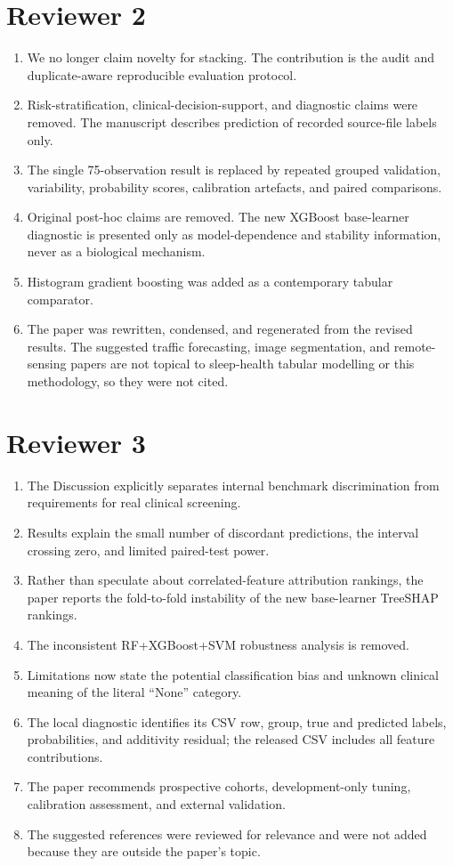 \documentclass[11pt]{article}
\begin{document}
\section*{Reviewer 2}
\begin{enumerate}
\item We no longer claim novelty for stacking. The contribution is the audit and duplicate-aware reproducible evaluation protocol.
\item Risk-stratification, clinical-decision-support, and diagnostic claims were removed. The manuscript describes prediction of recorded source-file labels only.
\item The single 75-observation result is replaced by repeated grouped validation, variability, probability scores, calibration artefacts, and paired comparisons.
\item Original post-hoc claims are removed. The new XGBoost base-learner diagnostic is presented only as model-dependence and stability information, never as a biological mechanism.
\item Histogram gradient boosting was added as a contemporary tabular comparator.
\item The paper was rewritten, condensed, and regenerated from the revised results. The suggested traffic forecasting, image segmentation, and remote-sensing papers are not topical to sleep-health tabular modelling or this methodology, so they were not cited.
\end{enumerate}

\section*{Reviewer 3}
\begin{enumerate}
\item The Discussion explicitly separates internal benchmark discrimination from requirements for real clinical screening.
\item Results explain the small number of discordant predictions, the interval crossing zero, and limited paired-test power.
\item Rather than speculate about correlated-feature attribution rankings, the paper reports the fold-to-fold instability of the new base-learner TreeSHAP rankings.
\item The inconsistent RF+XGBoost+SVM robustness analysis is removed.
\item Limitations now state the potential classification bias and unknown clinical meaning of the literal ``None'' category.
\item The local diagnostic identifies its CSV row, group, true and predicted labels, probabilities, and additivity residual; the released CSV includes all feature contributions.
\item The paper recommends prospective cohorts, development-only tuning, calibration assessment, and external validation.
\item The suggested references were reviewed for relevance and were not added because they are outside the paper's topic.
\end{enumerate}
\end{document}
